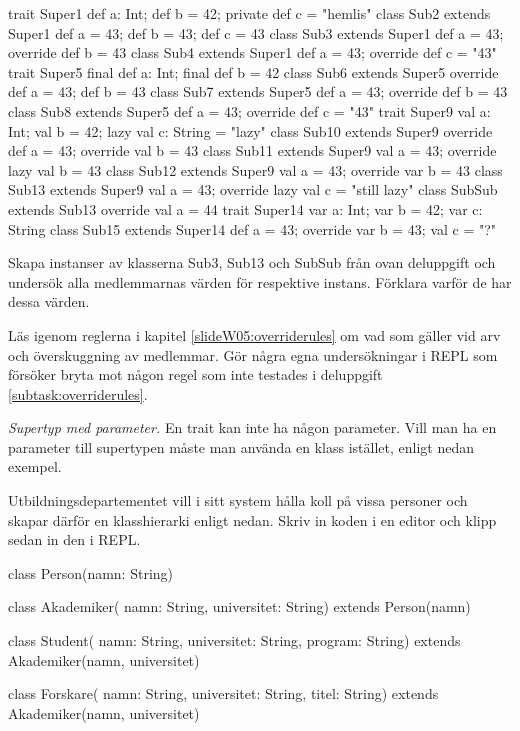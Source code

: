 \begin{REPL}
trait Super1 { def a: Int; def b = 42; private def c = "hemlis" }
class Sub2 extends Super1 { def a = 43; def b = 43; def c = 43 }   
class Sub3 extends Super1 { def a = 43; override def b = 43 }   
class Sub4 extends Super1 { def a = 43; override def c = "43" } 
trait Super5 { final def a: Int; final def b = 42 }
class Sub6 extends Super5 { override def a = 43; def b = 43 }   
class Sub7 extends Super5 { def a = 43; override def b = 43 }   
class Sub8 extends Super5 { def a = 43; override def c = "43" }   
trait Super9 { val a: Int; val b = 42; lazy val c: String = "lazy" }
class Sub10 extends Super9 { override def a = 43; override val b = 43 }   
class Sub11 extends Super9 { val a = 43; override lazy val b = 43 }   
class Sub12 extends Super9 { val a = 43; override var b = 43 }
class Sub13 extends Super9 { val a = 43; override lazy val c = "still lazy" } 
class SubSub extends Sub13 { override val a = 44}  
trait Super14 { var a: Int; var b = 42; var c: String }
class Sub15 extends Super14 { def a = 43; override var b = 43; val c = "?" } 
\end{REPL}

\Subtask Skapa instanser av klasserna Sub3, Sub13 och SubSub från ovan deluppgift och undersök alla medlemmarnas värden för respektive instans. Förklara varför de har dessa värden.

\Subtask Läs igenom reglerna i kapitel  \ref{slideW05:overriderules} om vad som gäller vid arv och överskuggning av medlemmar. Gör några egna undersökningar i REPL som försöker bryta mot någon regel som inte testades i deluppgift \ref{subtask:overriderules}.

\Task \emph{Supertyp med parameter.} En trait kan inte ha någon parameter. Vill man ha en parameter till supertypen måste man använda en klass istället, enligt nedan exempel. 

Utbildningsdepartementet vill i sitt system hålla koll på vissa personer och skapar därför en klasshierarki enligt nedan. Skriv in koden i en editor och klipp sedan in den i REPL.
\begin{Code}
class Person(namn: String)

class Akademiker(
  namn: String,   
  universitet: String) extends Person(namn)

class Student(
  namn: String, 
  universitet: String,
  program: String) extends Akademiker(namn, universitet)

class Forskare(
  namn: String, 
  universitet: String, 
  titel: String) extends Akademiker(namn, universitet)
\end{Code} 


